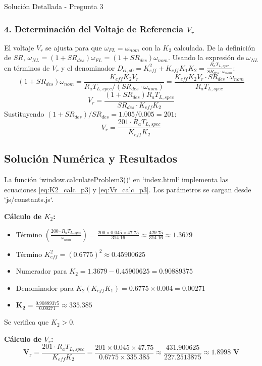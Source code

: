 \documentclass[12pt]{article}
\begin{document}
\begin{solutionbox}{Solución Detallada - Pregunta 3}
\subsubsection*{4. Determinación del Voltaje de Referencia $V_r$}
El voltaje $V_r$ se ajusta para que $\omega_{FL} = \omega_{nom}$ con la $K_2$ calculada. De la definición de $SR$, $\omega_{NL} = (1+SR_{des})\omega_{FL} = (1+SR_{des})\omega_{nom}$.
Usando la expresión de $\omega_{NL}$ en términos de $V_r$ y el denominador $D_{cl,s0} = K_{eff}^2 + K_{eff}K_1K_2 = \frac{R_a T_{L,spec}}{SR_{des} \cdot \omega_{nom}}$:\n
\[ (1+SR_{des})\omega_{nom} = \frac{K_{eff}K_2 V_r}{R_a T_{L,spec} / (SR_{des} \cdot \omega_{nom})} = \frac{K_{eff}K_2 V_r \cdot SR_{des} \cdot \omega_{nom}}{R_a T_{L,spec}} \]
\[ V_r = \frac{(1+SR_{des}) R_a T_{L,spec}}{SR_{des} \cdot K_{eff} K_2} \]
Sustituyendo $(1+SR_{des})/SR_{des} = 1.005/0.005 = 201$:\n
\begin{equation}\label{eq:Vr_calc_p3}
    V_r = \frac{201 \cdot R_a T_{L,spec}}{K_{eff} K_2}
\end{equation}

\subsection*{Solución Numérica y Resultados}
La función `window.calculateProblem3()` en `index.html` implementa las ecuaciones \eqref{eq:K2_calc_p3} y \eqref{eq:Vr_calc_p3}. Los parámetros se cargan desde `js/constants.js`.\n

\textbf{Cálculo de $K_2$:}
\begin{itemize}
    \item Término $\left( \frac{200 \cdot R_a T_{L,spec}}{\omega_{nom}} \right) = \frac{200 \times 0.045 \times 47.75}{314.16} \approx \frac{429.75}{314.16} \approx 1.3679$
    \item Término $K_{eff}^2 = (0.6775)^2 \approx 0.45900625$
    \item Numerador para $K_2 = 1.3679 - 0.45900625 = 0.90889375$
    \item Denominador para $K_2 (K_{eff}K_1) = 0.6775 \times 0.004 = 0.00271$
    \item $\mathbf{K_2} = \frac{0.90889375}{0.00271} \approx \mathbf{335.385}$
\end{itemize}
Se verifica que $K_2 > 0$.\n

\textbf{Cálculo de $V_r$:}
\[ \mathbf{V_r} = \frac{201 \cdot R_a T_{L,spec}}{K_{eff} K_2} = \frac{201 \times 0.045 \times 47.75}{0.6775 \times 335.385} \approx \frac{431.900625}{227.2513875} \approx \mathbf{1.8998 \text{ V}} \]


\end{solutionbox}
\end{document}
